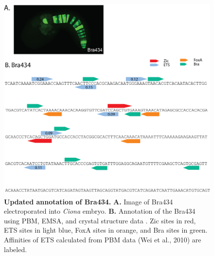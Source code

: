\begin{figure}[p]
    \centering
    \includegraphics[scale=.65]{2_figures-and-files/FigS6_Bra434-Dissection.png}
    \caption[Updated annotation of Bra434]{\textbf{Updated annotation of Bra434.} \textbf{A.} Image of Bra434 electroporated into \textit{Ciona} embryo. \textbf{B.} Annotation of the Bra434 using PBM, EMSA, and crystal structure data . Zic sites in red, ETS sites in light blue, FoxA sites in orange, and Bra sites in green. Affinities of ETS calculated from PBM data (Wei et al., 2010) are labeled.}
    \label{fig:supplement bra434 annotated}
\end{figure}
